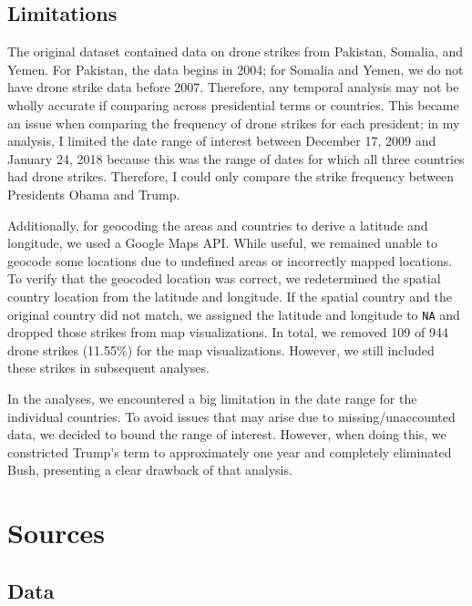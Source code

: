 \documentclass[
]{article}
\begin{document}
\hypertarget{limitations}{%
\subsection{Limitations}\label{limitations}}

The original dataset contained data on drone strikes from Pakistan,
Somalia, and Yemen. For Pakistan, the data begins in 2004; for Somalia
and Yemen, we do not have drone strike data before 2007. Therefore, any
temporal analysis may not be wholly accurate if comparing across
presidential terms or countries. This became an issue when comparing the
frequency of drone strikes for each president; in my analysis, I limited
the date range of interest between December 17, 2009 and January 24,
2018 because this was the range of dates for which all three countries
had drone strikes. Therefore, I could only compare the strike frequency
between Presidents Obama and Trump.

Additionally, for geocoding the areas and countries to derive a latitude
and longitude, we used a Google Maps API. While useful, we remained
unable to geocode some locations due to undefined areas or incorrectly
mapped locations. To verify that the geocoded location was correct, we
redetermined the spatial country location from the latitude and
longitude. If the spatial country and the original country did not
match, we assigned the latitude and longitude to \texttt{NA} and dropped
those strikes from map visualizations. In total, we removed 109 of 944
drone strikes (11.55\%) for the map visualizations. However, we still
included these strikes in subsequent analyses.

In the analyses, we encountered a big limitation in the date range for
the individual countries. To avoid issues that may arise due to
missing/unaccounted data, we decided to bound the range of interest.
However, when doing this, we constricted Trump's term to approximately
one year and completely eliminated Bush, presenting a clear drawback of
that analysis.

\pagebreak

\hypertarget{sources}{%
\section{Sources}\label{sources}}

\hypertarget{data}{%
\subsection{Data}\label{data}}
\end{document}
